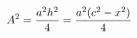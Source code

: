 \documentclass[preview]{standalone}
\begin{document}
\begin{align*}
\special{dvisvgm:raw <g id='unique000'>}A^2 = \frac{a^2 h^2}{4} = \frac{a^2 (c^2 - x^2)}{4}\special{dvisvgm:raw </g>}
\end{align*}
\end{document}
